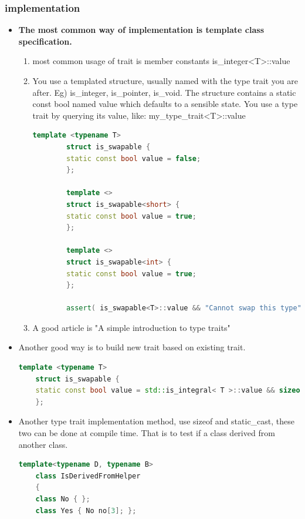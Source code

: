 \documentclass[a4paper,12pt,twoside]{book}
\begin{document}
\subsubsection{implementation}
\begin{itemize}
	\item \textbf{The most common way of implementation is template class specification.}
	\begin{enumerate}
		\item most common usage of trait is member constants is\_integer<T>::value
		
		\item You use a templated structure, usually named with the type trait you are after. Eg) is\_integer, is\_pointer, is\_void. The structure contains a static const bool named value which defaults to a sensible state. You use a type trait by querying its value, like: my\_type\_trait<T>::value
		
		
		\begin{lstlisting}[frame=single, language=c++]
		template <typename T>
		struct is_swapable {
		static const bool value = false;
		};
		
		template <>
		struct is_swapable<short> {
		static const bool value = true;
		};
		
		template <>
		struct is_swapable<int> {
		static const bool value = true;
		};
		
		assert( is_swapable<T>::value && "Cannot swap this type" );
		\end{lstlisting}
		\item A good article is "A simple introduction to type traits"
	\end{enumerate}
	
	\item Another good way is to build new trait based on existing trait.
	\begin{lstlisting}[frame=single, language=c++]
	template <typename T>
	struct is_swapable {
	static const bool value = std::is_integral< T >::value && sizeof( T ) >= 2;
	};
	\end{lstlisting}
	
	\item Another type trait implementation method, use sizeof and static\_cast, these two can be done at compile time. That is to test if a class derived from another class.
	\begin{lstlisting}[frame=single, language=c++]
	template<typename D, typename B>
	class IsDerivedFromHelper
	{
	class No { };
	class Yes { No no[3]; };
	

\end{lstlisting}
\end{itemize}
\end{document}
